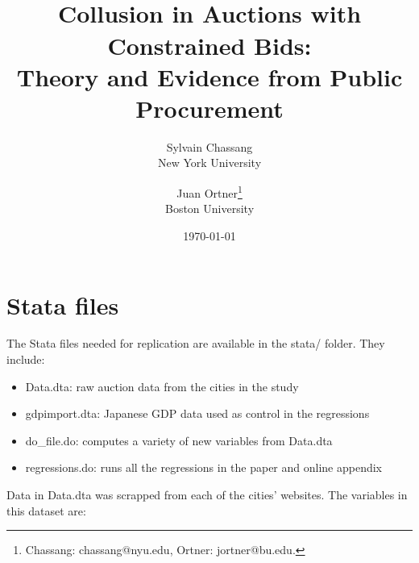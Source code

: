 \documentclass[12pt,  letterpaper]{article}
\title{{\sc{Replication Instructions for}} \\ Collusion in Auctions with Constrained Bids: \\ \Large{Theory and Evidence from Public Procurement}}
\author{Sylvain Chassang  \\ New York University \and Juan Ortner\thanks{Chassang: \textsf{chassang@nyu.edu}, Ortner:  \textsf{jortner@bu.edu}.}   \\ Boston University}
\date{ \today}
\newcommand{\1}{\mathbf{1}}
\begin{document}
\maketitle

\section{Stata files}

The Stata files needed for replication are available in the \textsf{stata/} folder. They include: 


\begin{onehalfspacing}
\begin{itemize}
\item \textsf{Data.dta}: raw auction data from the cities in the study
\item \textsf{gdpimport.dta}: Japanese GDP data used as control in the regressions
\item \textsf{do\_file.do}: computes a variety of new variables from \textsf{Data.dta}
\item \textsf{regressions.do}: runs all the regressions in the paper and online appendix
\end{itemize}
\end{onehalfspacing}

Data in \textsf{Data.dta} was scrapped from each of the cities' websites. The variables in this dataset are:
\end{document}
